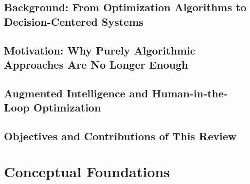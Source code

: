 \documentclass[preprint,12pt]{elsarticle}
\begin{document}
	\subsection{Background: From Optimization Algorithms to Decision-Centered Systems}
	
	\subsection{Motivation: Why Purely Algorithmic Approaches Are No Longer Enough}
	
	\subsection{Augmented Intelligence and Human-in-the-Loop Optimization}
	
	\subsection{Objectives and Contributions of This Review}
	
	\section{Conceptual Foundations}
	
\end{document}
